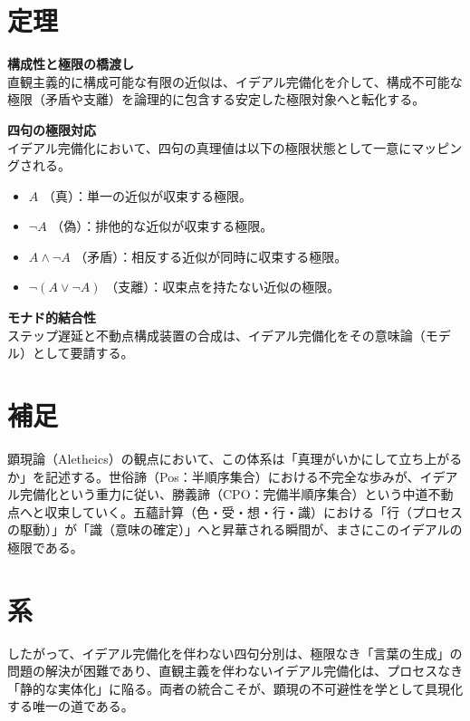 \documentclass[11pt,a4paper]{article}
\begin{document}
\section{定理}

\begin{description}[style=multiline, leftmargin=4cm]
  \item[定理 3.1] \textbf{構成性と極限の橋渡し}\\
  直観主義的に構成可能な有限の近似は、イデアル完備化を介して、構成不可能な極限（矛盾や支離）を論理的に包含する安定した極限対象へと転化する。
  
  \item[定理 3.2] \textbf{四句の極限対応}\\
  イデアル完備化において、四句の真理値は以下の極限状態として一意にマッピングされる。
  \begin{itemize}
    \item $A$ （真）：単一の近似が収束する極限。
    \item $\neg A$ （偽）：排他的な近似が収束する極限。
    \item $A \wedge \neg A$ （矛盾）：相反する近似が同時に収束する極限。
    \item $\neg(A \vee \neg A)$ （支離）：収束点を持たない近似の極限。
  \end{itemize}
  
  \item[定理 3.3] \textbf{モナド的結合性}\\
  ステップ遅延と不動点構成装置の合成は、イデアル完備化をその意味論（モデル）として要請する。
\end{description}

\section{補足}
顕現論（Aletheics）の観点において、この体系は「真理がいかにして立ち上がるか」を記述する。世俗諦（Pos：半順序集合）における不完全な歩みが、イデアル完備化という重力に従い、勝義諦（CPO：完備半順序集合）という中道不動点へと収束していく。五蘊計算（色・受・想・行・識）における「行（プロセスの駆動）」が「識（意味の確定）」へと昇華される瞬間が、まさにこのイデアルの極限である。

\section{系}
したがって、イデアル完備化を伴わない四句分別は、極限なき「言葉の生成」の問題の解決が困難であり、直観主義を伴わないイデアル完備化は、プロセスなき「静的な実体化」に陥る。両者の統合こそが、顕現の不可避性を学として具現化する唯一の道である。
\end{document}

